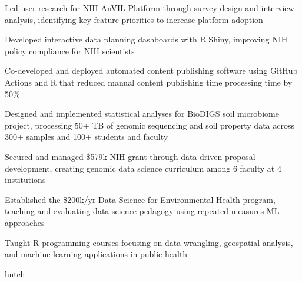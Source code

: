 \documentclass{ats_resume}
\newcommand{\itemspace}{\vspace{-2mm}}
\begin{document}
{{            \item Led user research for NIH AnVIL Platform through survey design and interview analysis, identifying key feature priorities to increase platform adoption
            \item Developed interactive data planning dashboards with R Shiny, improving NIH policy compliance for NIH scientists
            \item Co-developed and deployed automated content publishing software using GitHub Actions and R that reduced manual content publishing time processing time by 50\%
            \item Designed and implemented statistical analyses for BioDIGS soil microbiome project, processing 50+ TB of genomic sequencing and soil property data across 300+ samples and 100+ students and faculty
            \item Secured and managed \$579k NIH grant through data-driven proposal development, creating genomic data science curriculum among 6 faculty at 4 institutions
            \item Established the \$200k/yr Data Science for Environmental Health program, teaching and evaluating data science pedagogy using repeated measures ML approaches
            \item Taught R programming courses focusing on data wrangling, geospatial analysis, and machine learning applications in public health
       }{hutch} \\
       
       \itemspace

        \\
       
       \itemspace
       
}
\end{document}
